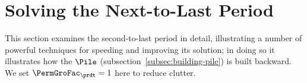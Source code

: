 
\hypertarget{solving-the-next-to-last-period}{}
\hypertarget{solving-the-next}{}
\section{Solving the Next-to-Last Period}\label{sec:solving-the-next}

This section examines the second-to-last period in detail, illustrating a number of powerful techniques for speeding and improving its solution; in doing so it illustrates how the {\pileName} $\Pile$ (subsection~\ref{subsec:building-pile}) is built backward. We set $\PermGroFac_{\prdt}=1$ here to reduce clutter.  

